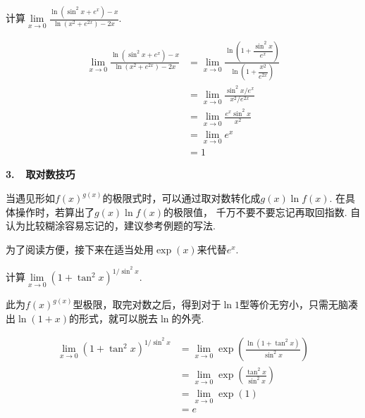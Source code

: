 \begin{example}
\label{ex:ch01-11}
计算$\lim\limits_{x \to 0}\displaystyle\frac{\ln(\sin^{2}x+e^{x})-x}{\ln(x^{2}+e^{2x})-2x}$.
\end{example}

\begin{solution}
\begin{equation}
    \begin{aligned}
        \lim\limits_{x \to 0}\frac{\ln(\sin^{2}x+e^{x})-x}{\ln(x^{2}+e^{2x})-2x}
        &= \lim\limits_{x \to 0}\frac{\ln(1+\dfrac{\sin^{2}x}{e^{x}})}{\ln(1+\dfrac{x^{2}}{e^{2x}})}\\
        &= \lim\limits_{x \to 0}\frac{\sin^2 x / e^x}{x^{2}/ e^{2x}}\\
        &= \lim\limits_{x \to 0}\frac{e^{x}\sin^{2}x}{x^{2}}\\
        &= \lim\limits_{x \to 0}e^{x} \\
        &= 1
        \nonumber
    \end{aligned}
\end{equation}
\end{solution}

\textbf{3.~~取对数技巧}\vspace{0.25em}

当遇见形如$f(x)^{g(x)}$的极限式时，可以通过取对数转化成$g(x)\ln f(x)$. 在具体操作时，若算出了$g(x)\ln f(x)$的极限值，
千万不要不要忘记再取回指数. 自认为比较糊涂容易忘记的，建议参考例题的写法.

为了阅读方便，接下来在适当处用$\exp(x)$来代替$e^{x}$.

\begin{example}
\label{ex:ch01-12}
计算$\lim\limits_{x \to 0}(1+\tan^{2}x)^{1/ \sin^{2}x}$.
\end{example}

\begin{analysis}
此为$f(x)^{g(x)}$型极限，取完对数之后，得到对于$\ln 1$型等价无穷小，只需无脑凑出$\ln(1+x)$的形式，就可以脱去$\ln$的外壳.
\end{analysis}

\begin{solution}
\begin{equation}
    \begin{aligned}
        \lim\limits_{x \to 0}(1+\tan^{2}x)^{1/\sin^{2}x}
        &= \lim\limits_{x \to 0}\exp \left( \frac{\ln(1+\tan^{2}x)}{\sin^2{x}}\right) \\
        &= \lim\limits_{x \to 0}\exp \left(\frac{\tan^{2}x}{\sin^2{x}} \right) \\
        &= \lim\limits_{x \to 0}\exp(1)\\
        &= e
        \nonumber
    \end{aligned}
\end{equation}
\end{solution}

